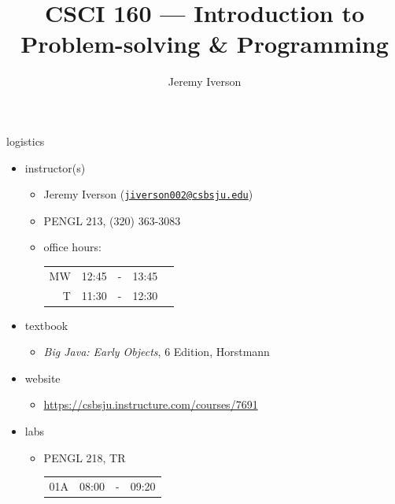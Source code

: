 \documentclass[10pt]{beamer}
\title{CSCI 160 --- Introduction to Problem-solving \& Programming}
\date{}
\author{Jeremy Iverson}
\institute{College of Saint Benedict \& Saint John's University}
\begin{document}
  \maketitle

  \begin{frame}{logistics}
    \begin{itemize}
      \item instructor(s)
        \begin{itemize}
          \item Jeremy Iverson (\href{mailto:jiverson002@csbsju.edu}{\nolinkurl{jiverson002@csbsju.edu}})
          \item PENGL 213, (320) 363-3083
          \item office hours: \begin{tabular}[t]{rrrcr}
                                MW & 12:45 & - & 13:45 \\
                                 T & 11:30 & - & 12:30
                              \end{tabular}
        \end{itemize}
      \item textbook
        \begin{itemize}
          \item \emph{Big Java: Early Objects}, 6 Edition, Horstmann
        \end{itemize}
      \item website
        \begin{itemize}
          \item \url{https://csbsju.instructure.com/courses/7691}
        \end{itemize}
      \item labs
        \begin{itemize}
          \item PENGL 218, TR \begin{tabular}[t]{rrcr}
                                01A & 08:00 & - & 09:20
                              \end{tabular}
        \end{itemize}
    \end{itemize}

  \end{frame}
\end{document}
